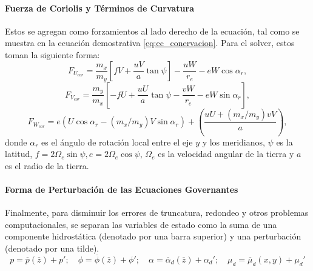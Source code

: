 \paragraph{Fuerza de Coriolis y Términos de Curvatura} Estos se agregan como forzamientos al lado derecho de la ecuación, tal como se muestra en la ecuación demostrativa \ref{eq:ec_conervacion}. Para el solver, estos toman la siguiente forma:
\begin{equation}
F_{U_{cor}} = \frac{m_x}{m_y}\left[ fV + \frac{uV}{a}\tan\psi \right] - \frac{uW}{r_e} - eW\cos\alpha_r,
\end{equation}
\begin{equation}
F_{V_{cor}} = \frac{m_y}{m_x}\left[ -fU + \frac{uU}{a}\tan\psi - \frac{vW}{r_e} - eW\sin\alpha_r \right],
\end{equation}
\begin{equation}
F_{W_{cor}} = e\left( U\cos\alpha_r - (m_x/m_y)V\sin\alpha_r \right) + \left( \frac{uU + (m_x/m_y)vV}{a} \right),
\end{equation}
donde $\alpha_r$ es el ángulo de rotación local entre el eje $y$ y los meridianos, $\psi$ es la latitud, $f=2\Omega_e\sin\psi, e=2\Omega_e\cos\psi$, $\Omega_e$ es la velocidad angular de la tierra y $a$ es el radio de la tierra.
\paragraph{Forma de Perturbación de las Ecuaciones Governantes} Finalmente, para disminuir los errores de truncatura, redondeo y otros problemas computacionales, se separan las variables de estado como la suma de una componente hidrostática (denotado por una barra superior) y una perturbación (denotado por una tilde).
\begin{equation*}
p=\overline{p}(\overline{z}) + p';\quad \phi=\overline{\phi}(\overline{z}) + \phi';\quad \alpha=\overline{\alpha}_d(\overline{z}) + \alpha_d';\quad \mu_d=\overline{\mu}_d(x,y) + \mu_d'
\end{equation*}

